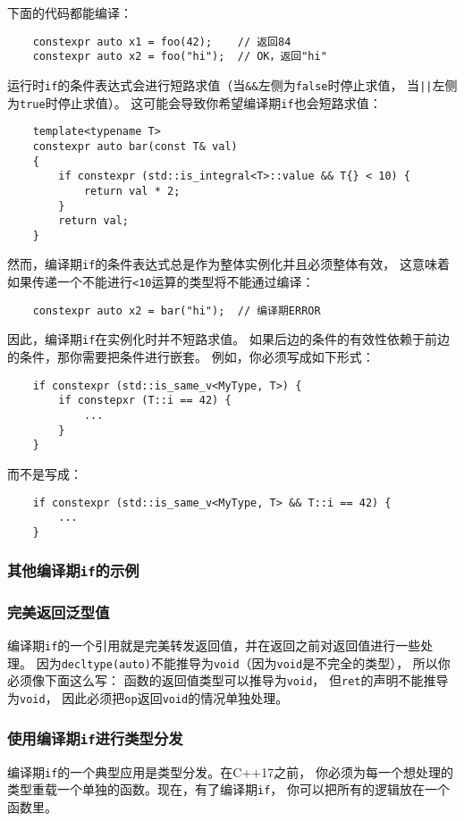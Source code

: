 下面的代码都能编译：
\begin{lstlisting}
    constexpr auto x1 = foo(42);    // 返回84
    constexpr auto x2 = foo("hi");  // OK，返回"hi"
\end{lstlisting}
运行时\texttt{if}的条件表达式会进行短路求值（当\texttt{\&\&}左侧为\texttt{false}时停止求值，
当\texttt{||}左侧为\texttt{true}时停止求值）。
这可能会导致你希望编译期\texttt{if}也会短路求值：
\begin{lstlisting}
    template<typename T>
    constexpr auto bar(const T& val)
    {
        if constexpr (std::is_integral<T>::value && T{} < 10) {
            return val * 2;
        }
        return val;
    }
\end{lstlisting}
然而，编译期\texttt{if}的条件表达式总是作为整体实例化并且必须整体有效，
这意味着如果传递一个不能进行\texttt{<10}运算的类型将不能通过编译：
\begin{lstlisting}
    constexpr auto x2 = bar("hi");  // 编译期ERROR
\end{lstlisting}
因此，编译期\texttt{if}在实例化时并不短路求值。
如果后边的条件的有效性依赖于前边的条件，那你需要把条件进行嵌套。
例如，你必须写成如下形式：
\begin{lstlisting}
    if constexpr (std::is_same_v<MyType, T>) {
        if constepxr (T::i == 42) {
            ...
        }
    }
\end{lstlisting}
而不是写成：
\begin{lstlisting}
    if constexpr (std::is_same_v<MyType, T> && T::i == 42) {
        ...
    }
\end{lstlisting}

\subsubsection{其他编译期\texttt{if}的示例}
\subsubsection*{完美返回泛型值}
编译期\texttt{if}的一个引用就是完美转发返回值，并在返回之前对返回值进行一些处理。
因为\texttt{decltype(auto)}不能推导为\texttt{void}（因为\texttt{void}是不完全的类型），
所以你必须像下面这么写：
函数的返回值类型可以推导为\texttt{void}，
但\texttt{ret}的声明不能推导为\texttt{void}，
因此必须把\texttt{op}返回\texttt{void}的情况单独处理。

\subsubsection*{使用编译期\texttt{if}进行类型分发}
编译期\texttt{if}的一个典型应用是类型分发。在C++17之前，
你必须为每一个想处理的类型重载一个单独的函数。现在，有了编译期\texttt{if}，
你可以把所有的逻辑放在一个函数里。


